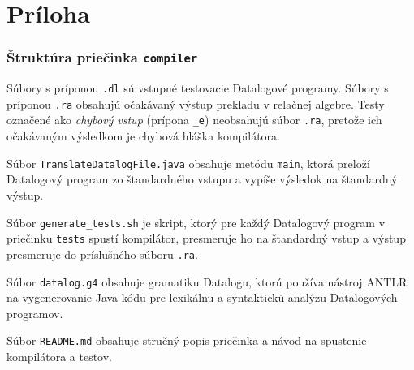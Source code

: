 \chapter*{Príloha}
\vspace{-1cm}

\subsection*{Štruktúra priečinka \texttt{compiler}}

\noindent
\begin{minipage}[t]{0.48\textwidth}
\end{minipage}\hfill
\begin{minipage}[t]{0.48\textwidth}
Súbory s príponou \texttt{.dl} sú vstupné testovacie Datalogové programy. Súbory s príponou
\texttt{.ra} obsahujú očakávaný výstup prekladu v relačnej algebre. Testy označené ako
\textit{chybový vstup} (prípona \texttt{\_e}) neobsahujú súbor \texttt{.ra}, pretože ich očakávaným
výsledkom je chybová hláška kompilátora.

\vline\vspace{-0.3cm}

Súbor \texttt{TranslateDatalogFile.java} obsahuje metódu \texttt{main}, ktorá preloží Datalogový
program zo štandardného vstupu a vypíše výsledok na štandardný výstup.

\vline\vspace{-0.3cm}

Súbor \texttt{generate\_tests.sh} je skript, ktorý pre každý Datalogový program v priečinku
\texttt{tests} spustí kompilátor, presmeruje ho na štandardný vstup a výstup presmeruje do
príslušného súboru \texttt{.ra}.

\vline\vspace{-0.3cm}

Súbor \texttt{datalog.g4} obsahuje gramatiku Datalogu, ktorú používa nástroj ANTLR na vygenerovanie
Java kódu pre lexikálnu a syntaktickú analýzu Datalogových programov.

\vline\vspace{-0.3cm}

Súbor \texttt{README.md} obsahuje stručný popis priečinka a návod na spustenie kompilátora a testov.
\end{minipage}

